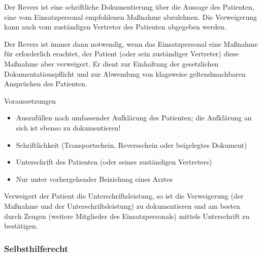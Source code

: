 \Text
{{\TxBeschreibung}}%
{%
%
\label{topic:revers}%
Der Revers ist eine schriftliche Dokumentierung über die
Aussage des Patienten, eine vom Einsatz\-personal
empfohlenen Maßnahme abzulehnen. Die Verweigerung kann auch
vom zuständigen Vertreter des Patienten abgegeben werden.

Der Revers ist immer dann notwendig, wenn das
Einsatzpersonal eine Maßnahme für erforderlich erachtet, der
Patient  (oder sein zuständiger Vertreter) diese Maßnahme
aber verweigert. Er dient zur Einhaltung der gesetzlichen
Dokumentationspflicht und zur Abwendung von  klagsweise
geltendmachbaren Ansprüchen des Patienten.
}%


\Text
{Voraussetzungen}%
{%
\begin{itemize}
  \item Auszufüllen nach umfassender Aufklärung des
  Patienten; die Aufklärung an sich ist ebenso zu
  dokumentieren!
  \item Schriftlichkeit (Transportschein, Reversschein oder
  beigelegtes Dokument)
  \item Unterschrift des Patienten (oder seines zuständigen
  Vertreters)
  \item Nur unter vorhergehender Beiziehung eines 
  Arztes
\end{itemize}

Verweigert der Patient die Unterschriftsleistung, so ist die
Verweigerung (der Maßnahme und der Unterschriftsleistung)
zu dokumentieren und am besten durch Zeugen (weitere
Mitglieder des Einsatzpersonals) mittels
Unterschrift zu bestätigen.
}%




\subsubsection{Selbsthilferecht}

